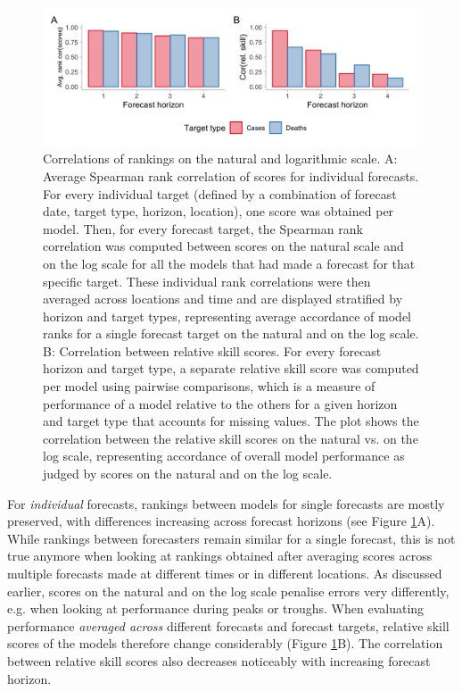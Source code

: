 \documentclass{article}
\begin{document}
\begin{figure}[h!]
    \centering
    \includegraphics[width=0.99\textwidth]{output/figures/HUB-correlations.png}
    \caption{Correlations of rankings on the natural and logarithmic scale. A: Average Spearman rank correlation of scores for individual forecasts. For every individual target (defined by a combination of forecast date, target type, horizon, location), one score was obtained per model. Then, for every forecast target, the Spearman rank correlation was computed between scores on the natural scale and on the log scale for all the models that had made a forecast for that specific target. These individual rank correlations were then averaged across locations and time and are displayed stratified by horizon and target types, representing average accordance of model ranks for a single forecast target on the natural and on the log scale. B: Correlation between relative skill scores. For every forecast horizon and target type, a separate relative skill score was computed per model using pairwise comparisons, which is a measure of performance of a model relative to the others for a given horizon and target type that accounts for missing values. The plot shows the correlation between the relative skill scores on the natural vs. on the log scale, representing accordance of overall model performance as judged by scores on the natural and on the log scale.}
    \label{fig:HUB-cors}
\end{figure}

For \textit{individual} forecasts, rankings between models for single forecasts are mostly preserved, with differences increasing across forecast horizons (see Figure \ref{fig:HUB-cors}A). While rankings between forecasters remain similar for a single forecast, this is not true anymore when looking at rankings obtained after averaging scores across multiple forecasts made at different times or in different locations. As discussed earlier, scores on the natural and on the log scale penalise errors very differently, e.g. when looking at performance during peaks or troughs. When evaluating performance \textit{averaged across} different forecasts and forecast targets, relative skill scores of the models therefore change considerably (Figure \ref{fig:HUB-cors}B). The correlation between relative skill scores also decreases noticeably with increasing forecast horizon. 
\end{document}
